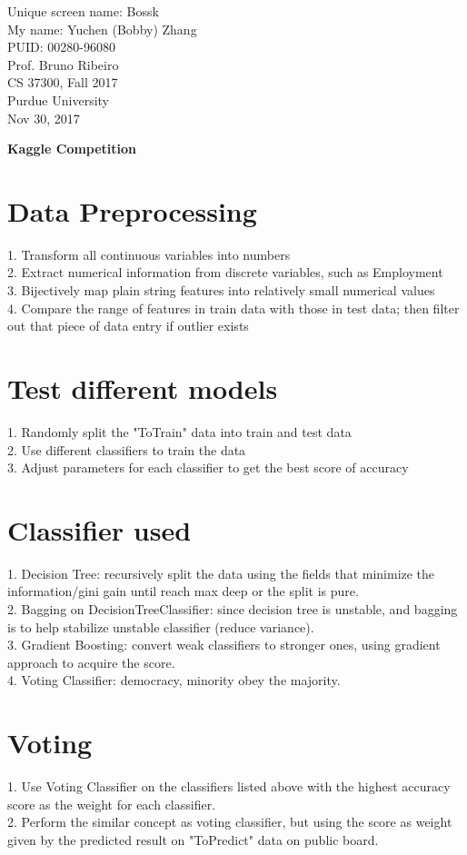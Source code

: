 \documentclass[12pt]{article}
\begin{document}
\flushleft
Unique screen name: Bossk\\
My name: Yuchen (Bobby) Zhang\\
PUID: 00280-96080\\

Prof. Bruno Ribeiro\\
CS 37300, Fall 2017\\
Purdue University\\
Nov 30, 2017\\

\begin{center}
\textbf{\LARGE Kaggle Competition}
\end{center}

\section*{Data Preprocessing}
{\Large
1. Transform all continuous variables into numbers\\
2. Extract numerical information from discrete variables, such as Employment\\
3. Bijectively map plain string features into relatively small numerical values\\
4. Compare the range of features in train data with those in test data; then filter out that piece of data entry if outlier exists\\
}
\section*{Test different models}
{\Large
1. Randomly split the "ToTrain" data into train and test data\\
2. Use different classifiers to train the data\\
3. Adjust parameters for each classifier to get the best score of accuracy\\
}
\section*{Classifier used}
{\Large
1. Decision Tree: recursively split the data using the fields that minimize the information/gini gain until reach max deep or the split is pure.\\
2. Bagging on DecisionTreeClassifier: since decision tree is unstable, and bagging is to help stabilize unstable classifier (reduce variance).\\
3. Gradient Boosting: convert weak classifiers to stronger ones, using gradient approach to acquire the score.\\
4. Voting Classifier: democracy, minority obey the majority.\\
}
\newpage
\section*{Voting}
{\Large
1. Use Voting Classifier on the classifiers listed above with the highest accuracy score as the weight for each classifier.\\
2. Perform the similar concept as voting classifier, but using the score as weight given by the predicted result on "ToPredict" data on public board.\\
}
\end{document}
